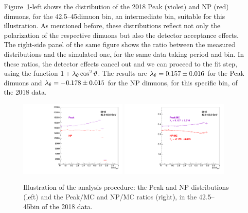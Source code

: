 Figure~\ref{fig:Peak-NP-pol}-left shows the \abscosth distribution of the 2018 Peak (violet) 
and NP (red) dimuons, for the 42.5--45\GeV dimuon \pt bin, 
an intermediate \pt bin, suitable for this illustration.
As mentioned before, 
these distributions reflect not only the polarization of the respective dimuons 
but also the detector acceptance effects.
The right-side panel of the same figure shows the ratio between the measured 
distributions and the simulated one, for the same data taking period and \pt bin.
In these ratios, the detector effects cancel out and we can proceed to the fit step,
using the function $1 + \lambda_\theta \cos^2 \vartheta$.
The results are $\lambda_\theta = 0.157 \pm 0.016$ for the Peak dimuons and 
$\lambda_\theta = -0.178 \pm 0.015$ for the NP dimuons, for this specific \pt bin, 
of the 2018 data.

\begin{figure}[h]
\centering
\includegraphics[width=0.48\textwidth]{Figures/chapter3/bin2B_7.pdf}
\includegraphics[width=0.48\textwidth]{Figures/chapter3/bin2F_7.pdf}
\caption{Illustration of the analysis procedure: 
the Peak and NP \abscosth distributions (left) 
and the Peak/MC and NP/MC ratios (right), 
in the 42.5--45\GeV \pt bin of the 2018 data.}
\label{fig:Peak-NP-pol}
\end{figure}

\vfill\newpage

